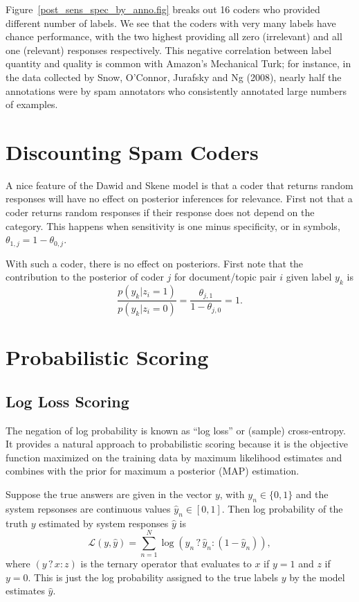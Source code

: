 \documentclass{article}
\begin{document}
Figure~\ref{post_sens_spec_by_anno.fig} breaks out 16 coders who
provided different number of labels.  We see that the coders with very
many labels have chance performance, with the two highest providing
all zero (irrelevant) and all one (relevant) responses respectively.  This negative correlation
between label quantity and quality is common with Amazon's Mechanical
Turk; for instance, in the data collected by Snow, O'Connor, Jurafsky
and Ng (2008), nearly half the annotations were by spam annotators
who consistently annotated large numbers of examples.


\section{Discounting Spam Coders}\label{spam-coder-sec}

A nice feature of the Dawid and Skene model is that a coder that
returns random responses will have no effect on posterior inferences
for relevance.  First not that a coder returns random responses if
their response does not depend on the category.  This happens when
sensitivity is one minus specificity, or in symbols, $\theta_{1,j} = 1
- \theta_{0,j}$.  

With such a coder, there is no effect on posteriors.  First note that
the contribution to the posterior of coder $j$ for document/topic pair
$i$ given label $y_k$ is 
%
\[
\frac{p(y_k|z_i =1)}{p(y_k|z_i = 0)}
= \frac{\theta_{j,1}}{1 - \theta_{j,0}} = 1.
\]


\section{Probabilistic Scoring}

\subsection{Log Loss Scoring}\label{log-loss-sec}

The negation of log probability is known as ``log loss'' or (sample)
cross-entropy.  It provides a natural approach to probabilistic
scoring because it is the objective function maximized on the
training data by maximum likelihood estimates and combines with the
prior for maximum a posterior (MAP) estimation.

Suppose the true answers are given in the vector
$y$, with $y_n \in \{ 0, 1 \}$ and the system repsonses are continuous
values $\hat{y}_n \in [0,1]$.  Then log probability of the truth 
$y$ estimated by system responses $\hat{y}$ is
%
\[
{\mathcal L}(y,\hat{y})  = \sum_{n=1}^N \log (y_n \, ? \, \hat{y}_n : (1 - \hat{y}_n)),
\]
%
where $(y \, ? \, x : z)$ is the ternary operator that evaluates to $x$ if $y
= 1$ and $z$ if $y = 0$.  This is just the log probability assigned to
the true labels $y$ by the model estimates $\hat{y}$.
\end{document}
